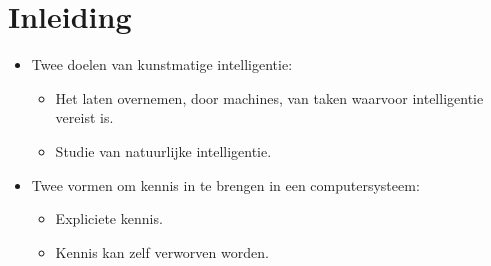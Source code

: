 \documentclass{report}
\begin{document}
\chapter{Inleiding}
	\begin{itemize}
		\item Twee doelen van kunstmatige intelligentie:
			\begin{itemize}
			\item Het laten overnemen, door machines, van taken waarvoor intelligentie vereist is.
			\item Studie van natuurlijke intelligentie.
			\end{itemize}
		\item Twee vormen om kennis in te brengen in een computersysteem:
			\begin{itemize}
				\item Expliciete kennis.
				\item Kennis kan zelf verworven worden.
			\end{itemize}
	\end{itemize}
\end{document}
